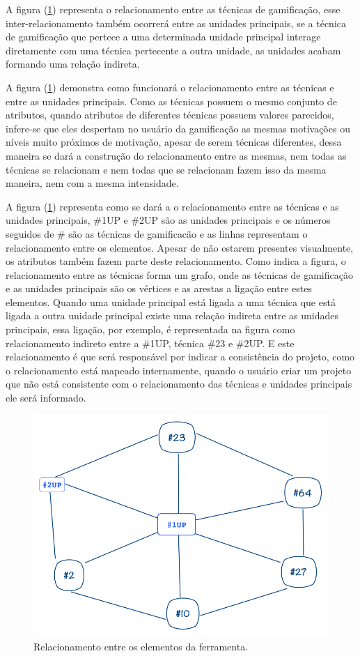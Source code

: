 A figura (\ref{fig05}) representa o relacionamento entre as técnicas de gamificação, esse inter-relacionamento também ocorrerá entre as unidades principais, se a técnica de gamificação que pertece a uma determinada unidade principal interage diretamente com uma técnica pertecente a outra unidade, as unidades acabam formando uma relação indireta. 

A figura (\ref{fig05}) demonstra como funcionará o relacionamento entre as técnicas e entre as unidades principais. Como as técnicas possuem o mesmo conjunto de atributos, quando atributos de diferentes técnicas possuem valores parecidos, infere-se que eles despertam no usuário da gamificação as mesmas motivações ou níveis muito próximos de motivação, apesar de serem técnicas diferentes, dessa maneira se dará a construção do relacionamento entre as mesmas, nem todas as técnicas se relacionam e nem todas que se relacionam fazem isso da mesma maneira, nem com a mesma intensidade.

A figura (\ref{fig05}) representa como se dará a o relacionamento entre as técnicas e as unidades principais, \#1UP e \#2UP são as unidades principais e os números seguidos de \# são as técnicas de gamificacão e as linhas representam o relacionamento entre os elementos. Apesar de não estarem presentes visualmente, os atributos também fazem parte deste relacionamento. Como indica a figura, o relacionamento entre as técnicas forma um grafo, onde as técnicas de gamificação e as unidades principais são os vértices e as arestas a ligação entre estes elementos. Quando uma unidade principal está ligada a uma técnica que está ligada a outra unidade principal existe uma relação indireta entre as unidades principais, essa ligação, por exemplo, é representada na figura como relacionamento indireto entre a \#1UP, técnica \#23 e \#2UP. E este relacionamento é que será responsável por indicar a consistência do projeto, como o relacionamento está mapeado internamente, quando o usuário criar um projeto que não está consistente com o relacionamento das técnicas e unidades principais ele será informado.

\begin{figure}[h]
	\centering
		\includegraphics[keepaspectratio=true,scale=0.5]{figuras/grafo.png}
	\caption{Relacionamento entre os elementos da ferramenta.\label{fig05}}
\end{figure}


